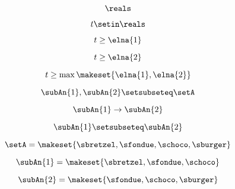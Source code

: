 {\begin{forslides}
        \begin{equation}
            \label{eq:combination-063}
            \reals
        \end{equation}

        \begin{equation}
            \label{eq:combination-064}
            t \setin \reals
        \end{equation}

        \begin{equation}
            \label{eq:combination-065}
            t \geq \elna{1}
        \end{equation}

        \begin{equation}
            \label{eq:combination-066}
            t \geq \elna{2}
        \end{equation}

        \begin{equation}
            \label{eq:combination-067}
            t \geq \max \makeset{ \elna{1}, \elna{2} }
        \end{equation}

        \begin{equation}
            \label{eq:combination-068}
            \subAn{1}, \subAn{2} \setsubseteq \setA
        \end{equation}

        \begin{equation}
            \label{eq:combination-069}
            \subAn{1} \to \subAn{2}
        \end{equation}

        \begin{equation}
            \label{eq:combination-070}
            \subAn{1} \setsubseteq \subAn{2}
        \end{equation}

        \begin{equation}
            \label{eq:combination-071}
            \setA = \makeset{ \sbretzel, \sfondue, \schoco, \sburger }
        \end{equation}

        \begin{equation}
            \label{eq:combination-071b}
            \subAn{1} = \makeset{ \sbretzel, \sfondue, \schoco }
        \end{equation}

        \begin{equation}
            \label{eq:combination-072}
            \subAn{2} = \makeset{\sfondue, \schoco, \sburger }
        \end{equation}


\end{forslides}}
